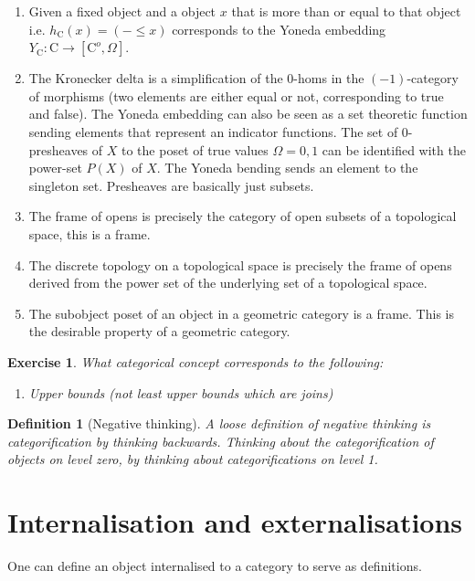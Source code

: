 \documentclass{tufte-book}
\newtheorem{definition}[theorem]{Definition}
\newtheorem{exercise}[theorem]{Exercise}
\begin{document}
\begin{enumerate}
 	\item Given a fixed object and a object $x$ that is more than or equal to that object i.e. $h_\mathrm{C}(x) = (- \leq x)$ corresponds to the Yoneda embedding $Y_\mathrm{C} : \mathrm{C} \rightarrow [\mathrm{C}^o, \Omega]$.
 	\item The Kronecker delta is a simplification of the $0$-homs in the $(-1)$-category of morphisms (two elements are either equal or not, corresponding to true and false). The Yoneda embedding can also be seen as a set theoretic function sending elements that represent an indicator functions. The set of $0$-presheaves of $X$ to the poset of true values $\Omega = {0,1}$ can be identified with the power-set $P(X)$ of $X$. The Yoneda bending sends an element to the singleton set. Presheaves are basically just subsets.
 	\item The frame of opens is precisely the category of open subsets of a topological space, this is a frame.
 	\item The discrete topology on a topological space is precisely the frame of opens derived from the power set of the underlying set of a topological space.
 	\item The subobject poset of an object in a geometric category is a frame. This is the desirable property of a geometric category.
 \end{enumerate}
 
 \begin{exercise}
 What categorical concept corresponds to the following:
 
 \begin{enumerate}
 	\item Upper bounds (not least upper bounds which are joins)
 \end{enumerate}
 
 \end{exercise}
 
 \begin{definition}[Negative thinking]
 	A loose definition of negative thinking is categorification by thinking backwards. Thinking about the categorification of objects on level zero, by thinking about categorifications on level 1.
 \end{definition}

 \section{Internalisation and externalisations}
 
 One can define an object internalised to a category to
 serve as definitions.
 
\end{document}
